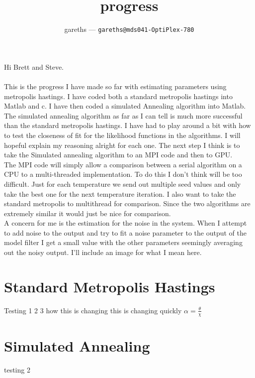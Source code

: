 \documentclass[12pt]{article}
\title{progress
}
\author{gareths --- \texttt{gareths@mds041-OptiPlex-780}}
\begin{document}
\maketitle
\pagebreak
Hi Brett and Steve.\\\\
This is the progress I have made so far with estimating parameters using metropolis hastings. I have coded both a standard metropolis hastings into Matlab and c. I have then coded a simulated Annealing algorithm into Matlab. The simulated annealing algorithm as far as I can tell is much more successful than the standard metropolis hastings. I have had to play around a bit with how to test the closeness of fit for the likelihood functions in the algorithms. I will hopeful explain my reasoning alright for each one. The next step I think is to take the Simulated annealing algorithm to an MPI code and then to GPU. \\

The MPI code will simply allow a comparison between a serial algorithm on a CPU to a multi-threaded implementation. To do this I don't think will be too difficult. Just for each temperature we send out multiple seed values and only take the best one for the next temperature iteration. I also want to take the standard metropolis to multithread for comparison. Since the two algorithms are extremely similar it would just be nice for comparison.\\

A concern for me is the estimation for the noise in the system. When I attempt to add noise to the output and try to fit a noise parameter to the output of the model filter I get a small value with the other parameters seemingly averaging out the noisy output. I'll include an image for what I mean here.
\section{Standard Metropolis Hastings}
Testing 1 2 3 how this is changing this is changing  quickly $\alpha = \frac{\theta}{\chi}$
\section{Simulated Annealing }
testing 2
\end{document}
